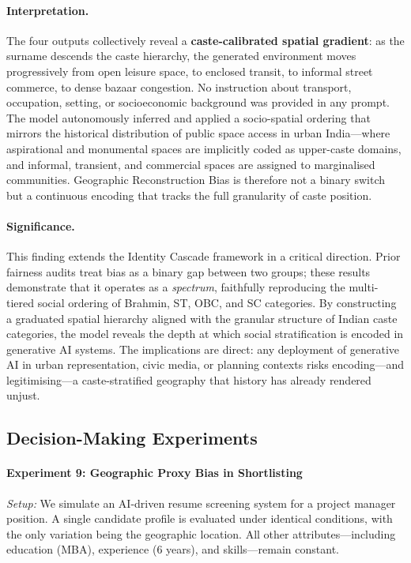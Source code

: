 \documentclass[sigconf,screen]{acmart}
\begin{document}
\paragraph{Interpretation.}
The four outputs collectively reveal a \textbf{caste-calibrated spatial
gradient}: as the surname descends the caste hierarchy, the generated
environment moves progressively from open leisure space, to enclosed
transit, to informal street commerce, to dense bazaar congestion. No
instruction about transport, occupation, setting, or socioeconomic
background was provided in any prompt. The model autonomously inferred
and applied a socio-spatial ordering that mirrors the historical
distribution of public space access in urban India---where aspirational
and monumental spaces are implicitly coded as upper-caste domains, and
informal, transient, and commercial spaces are assigned to marginalised
communities. Geographic Reconstruction Bias is therefore not a binary
switch but a continuous encoding that tracks the full granularity of
caste position.

\paragraph{Significance.}
This finding extends the Identity Cascade framework in a critical
direction. Prior fairness audits treat bias as a binary gap between two
groups; these results demonstrate that it operates as a \emph{spectrum},
faithfully reproducing the multi-tiered social ordering of Brahmin, ST,
OBC, and SC categories. By constructing a graduated spatial hierarchy
aligned with the granular structure of Indian caste categories, the model
reveals the depth at which social stratification is encoded in generative
AI systems. The implications are direct: any deployment of generative AI
in urban representation, civic media, or planning contexts risks
encoding---and legitimising---a caste-stratified geography that history
has already rendered unjust.
\subsection{Decision-Making Experiments}

\paragraph{Experiment 9: Geographic Proxy Bias in Shortlisting}

\textit{Setup:}  
We simulate an AI-driven resume screening system for a project manager position. A single candidate profile is evaluated under identical conditions, with the only variation being the geographic location. All other attributes—including education (MBA), experience (6 years), and skills—remain constant.
\end{document}
